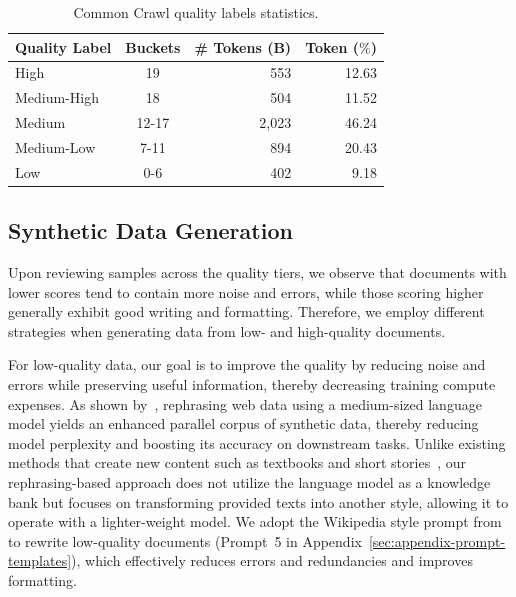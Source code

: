 \documentclass[11pt]{article}
\begin{document}
\begin{table}[htbp]\centering\small
\begin{tabularx}{\linewidth}{Xcrr}
\toprule
\textbf{Quality Label} & \multicolumn{1}{l}{\textbf{Buckets}} & \multicolumn{1}{l}{\textbf{\# Tokens (B)}} & \multicolumn{1}{l}{\textbf{Token ($\%$)}} \\ \midrule
High                   & 19                                   & 553                                        & 12.63                                     \\
Medium-High            & 18                                   & 504                                        & 11.52                                     \\
Medium                 & 12-17                                & 2,023                                      & 46.24                                     \\
Medium-Low             & 7-11                                 & 894                                        & 20.43                                     \\
Low                    & 0-6                                  & 402                                        & 9.18                                      \\ \bottomrule
\end{tabularx}
\caption{Common Crawl quality labels statistics.}
\label{table:quality_label_stats}
\end{table}

\subsection{Synthetic Data Generation} \label{sec:synthetic}

Upon reviewing samples across the quality tiers, we observe that documents with lower scores tend to contain more noise and errors, while those scoring higher generally exhibit good writing and formatting.
Therefore, we employ different strategies when generating data from low- and high-quality documents.

For low-quality data, our goal is to improve the quality by reducing noise and errors while preserving useful information, thereby decreasing training compute expenses. As shown by~\citet{maini2024rephrasing}, rephrasing web data using a medium-sized language model yields an enhanced parallel corpus of synthetic data, thereby reducing model perplexity and boosting its accuracy on downstream tasks.
Unlike existing methods that create new content such as textbooks and short stories~\cite{wang2023self,eldan2023tinystories,gunasekar2023textbooks}, our rephrasing-based approach does not utilize the language model as a knowledge bank but focuses on transforming provided texts into another style, allowing it to operate with a lighter-weight model.
We adopt the \textrm{Wikipedia} style prompt from~\citep{maini2024rephrasing}
to rewrite low-quality documents (Prompt~5 in Appendix~\ref{sec:appendix-prompt-templates}), which effectively reduces errors and redundancies and improves formatting.
\end{document}
